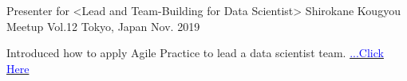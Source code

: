 

\begin{cventries}

  \cventry
    {Presenter for <Lead and Team-Building for Data Scientist>} %
    {Shirokane Kougyou Meetup Vol.12} %
    {Tokyo, Japan} %
    {Nov. 2019} %
    {
      \begin{cvitems} %
        \item {Introduced how to apply Agile Practice to lead a data scientist team. \href{https://note.com/87date/n/nfa2c9e6953f0}{\textcolor{blue}{...Click Here}}}
      \end{cvitems}
    }


\end{cventries}
